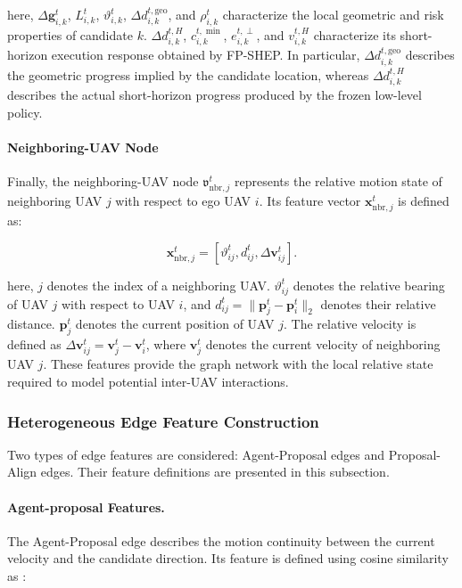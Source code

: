 \noindent
here, $\Delta\mathbf{g}_{i,k}^{t}$, $L_{i,k}^{t}$, $\vartheta_{i,k}^{t}$, $\Delta d_{i,k}^{t,\mathrm{geo}}$, and $\rho_{i,k}^{t}$ characterize the local geometric and risk properties of candidate $k$. $\Delta d_{i,k}^{t,H}$, $c_{i,k}^{t,\min}$, $e_{i,k}^{t,\perp}$, and $v_{i,k}^{t,H}$ characterize its short-horizon execution response obtained by FP-SHEP. In particular, $\Delta d_{i,k}^{t,\mathrm{geo}}$ describes the geometric progress implied by the candidate location, whereas $\Delta d_{i,k}^{t,H}$ describes the actual short-horizon progress produced by the frozen low-level policy.

\paragraph{Neighboring-UAV Node}
Finally, the neighboring-UAV node $\mathfrak{v}_{\mathrm{nbr},j}^{t}$ represents the relative motion state of neighboring UAV $j$ with respect to ego UAV $i$. Its feature vector $\mathbf{x}_{\mathrm{nbr},j}^{t}$ is defined as:

\begin{equation}
    \label{eq:neighbor_node}
    \mathbf{x}_{\mathrm{nbr},j}^{t}
    =
    \left[
        \vartheta_{ij}^{t},
        d_{ij}^{t},
        \Delta\mathbf{v}_{ij}^{t}
    \right].
\end{equation}

\noindent
here, $j$ denotes the index of a neighboring UAV. $\vartheta_{ij}^{t}$ denotes the relative bearing of UAV $j$ with respect to UAV $i$, and $d_{ij}^{t}=\|\mathbf{p}_{j}^{t}-\mathbf{p}_{i}^{t}\|_{2}$ denotes their relative distance. $\mathbf{p}_{j}^{t}$ denotes the current position of UAV $j$. The relative velocity is defined as $\Delta\mathbf{v}_{ij}^{t}=\mathbf{v}_{j}^{t}-\mathbf{v}_{i}^{t}$, where $\mathbf{v}_{j}^{t}$ denotes the current velocity of neighboring UAV $j$. These features provide the graph network with the local relative state required to model potential inter-UAV interactions.

\subsubsection{Heterogeneous Edge Feature Construction}

Two types of edge features are considered: Agent-Proposal edges and Proposal-Align edges. Their feature definitions are presented in this subsection.

\paragraph{Agent-proposal Features.}
The Agent-Proposal edge describes the motion continuity between the current velocity and the candidate direction. Its feature is defined using cosine similarity as :

